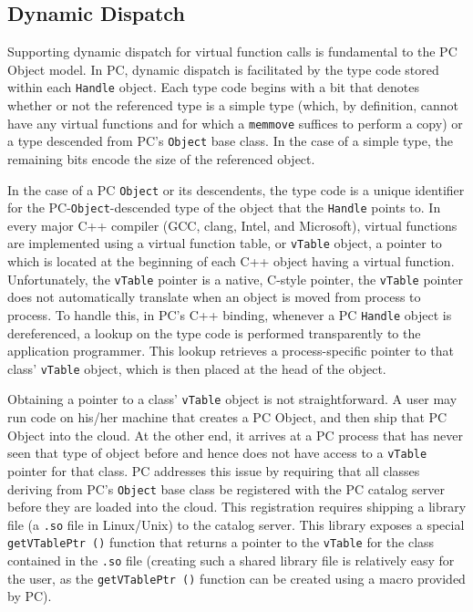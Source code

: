 \subsection{Dynamic Dispatch}

Supporting dynamic dispatch for virtual function calls is fundamental to the PC Object model.
In PC, dynamic dispatch is facilitated by the type code stored within each
\texttt{Handle} object.
Each type code begins with a bit that denotes whether or not the referenced type is a simple type (which, by definition, cannot have any
virtual functions and for which a \texttt{memmove} suffices to perform a copy) or a type descended from PC's \texttt{Object} base class.
In the case of a simple type, the remaining bits encode the size of the referenced object.  

In the case of a PC \texttt{Object} or its descendents, the
type code is a unique identifier for the PC-\texttt{Object}-descended type of the object that the \texttt{Handle} points to.
In every major C++ compiler (GCC, clang, Intel, and Microsoft), virtual functions
are implemented using a virtual function table, or \texttt{vTable} object, a pointer to which is located at the beginning
of each C++ object having a virtual function.  Unfortunately, the \texttt{vTable} pointer is a native, C-style pointer, the
\texttt{vTable} pointer does not automatically translate when an
object is moved from process to process.  To handle this, in
PC's C++ binding, whenever a PC \texttt{Handle} object is dereferenced, 
a lookup on the
type code is performed transparently to the application programmer.  This lookup retrieves a process-specific pointer to that class' \texttt{vTable} object, which is
then placed at the head of the object.

Obtaining a pointer to a class' \texttt{vTable} object is not straightforward.
A user may run code on his/her machine that creates
a PC Object, and then ship that PC Object into the cloud.  At the other end, it arrives at a PC process that has never seen that type of object before and hence
does not have access to a \texttt{vTable} pointer for that class.
PC addresses this issue by requiring that all classes deriving from PC's \texttt{Object} base class be registered with the PC catalog
server before they are loaded into the cloud.  This registration requires shipping a library file (a \texttt{.so} file in Linux/Unix) to
the catalog server.  This library exposes a special \texttt{getVTablePtr ()} function that returns a pointer to the \texttt{vTable} for the class contained
in the \texttt{.so} file (creating such
a shared library file is relatively easy for the user, as the \texttt{getVTablePtr ()} function can be created using a macro provided by PC).

